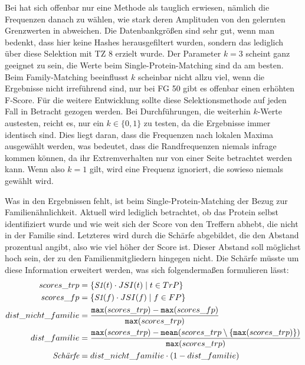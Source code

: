     Bei  hat sich offenbar nur eine Methode als tauglich erwiesen, nämlich die Frequenzen danach zu wählen, wie stark deren Amplituden von den gelernten Grenzwerten in  abweichen. Die Datenbankgrößen sind sehr gut, wenn man bedenkt, dass hier keine Hashes herausgefiltert wurden, sondern das lediglich über diese Selektion mit \ac{TZ} 8 erzielt wurde. Der Parameter $k=3$ scheint ganz geeignet zu sein, die Werte beim Single-Protein-Matching sind da am besten. Beim Family-Matching beeinflusst $k$ scheinbar nicht allzu viel, wenn die Ergebnisse nicht irreführend sind, nur bei \ac{FG} 50 gibt es offenbar einen erhöhten F-Score. Für die weitere Entwicklung sollte diese Selektionsmethode auf jeden Fall in Betracht gezogen werden. Bei Durchführungen, die weiterhin $k$-Werte austesten, reicht es, nur ein $k \in \{0, 1\}$ zu testen, da die Ergebnisse immer identisch sind. Dies liegt daran, dass die Frequenzen nach lokalen Maxima ausgewählt werden, was bedeutet, dass die Randfrequenzen niemals infrage kommen können, da ihr Extremverhalten nur von einer Seite betrachtet werden kann. Wenn also $k=1$ gilt, wird eine Frequenz ignoriert, die sowieso niemals gewählt wird.

    Was in den Ergebnissen fehlt, ist beim Single-Protein-Matching der Bezug zur Familienähnlichkeit. Aktuell wird lediglich betrachtet, ob das Protein selbst identifiziert wurde und wie weit sich der Score von den Treffern abhebt, die nicht in der Familie sind. Letzteres wird durch die Schärfe abgebildet, die den Abstand prozentual angibt, also wie viel höher der Score ist. Dieser Abstand soll möglichst hoch sein, der zu den Familienmitgliedern hingegen nicht. Die Schärfe müsste um diese Information erweitert werden, was sich folgendermaßen formulieren lässt:
    \begin{equation}
        \label{equ:}
        \begin{split}
            scores\_trp &= \{\emph{S1}(t) \cdot JSI(t) \mid t \in TrP\}\\
            scores\_fp &= \{\emph{S1}(f) \cdot JSI(f) \mid f \in FP\}\\
            dist\_nicht\_familie &= \frac{\texttt{max}(scores\_trp) - \texttt{max}(scores\_fp)}{\texttt{max}(scores\_trp)}\\
            dist\_familie &= \frac{\texttt{max}(scores\_trp) - \texttt{mean}(scores\_trp \setminus \{\texttt{max}(scores\_trp)\})}{\texttt{max}(scores\_trp)}\\
            \emph{Schärfe} &= dist\_nicht\_familie \cdot (1 - dist\_familie)
        \end{split}
    \end{equation}

